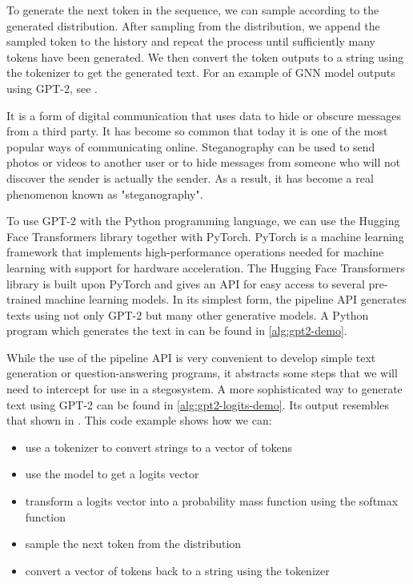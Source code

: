 To generate the next token in the sequence, we can sample according to the generated distribution.
After sampling from the distribution, we append the sampled token to the history and repeat the process until sufficiently many tokens have been generated.
We then convert the token outputs to a string using the tokenizer to get the generated text.
For an example of GNN model outputs using GPT-2, see .

\begin{example}
It is a form of digital communication that uses data to hide or obscure messages from a third party. It has become so common that today it is one of the most popular ways of communicating online. Steganography can be used to send photos or videos to another user or to hide messages from someone who will not discover the sender is actually the sender. As a result, it has become a real phenomenon known as "steganography".
  \label{example:gpt2-output-sample}
\end{example}

To use GPT-2 with the Python programming language, we can use the Hugging Face Transformers library together with PyTorch.
PyTorch \cite{PyTorch} is a machine learning framework that implements high-performance operations needed for machine learning with support for hardware acceleration.
The Hugging Face Transformers library \cite{HFTransformers} is built upon PyTorch and gives an API for easy access to several pre-trained machine learning models.
In its simplest form, the pipeline API generates texts using not only GPT-2 but many other generative models.
A Python program which generates the text in  can be found in \autoref{alg:gpt2-demo}.

While the use of the pipeline API is very convenient to develop simple text generation or question-answering programs, it abstracts some steps that we will need to intercept for use in a stegosystem.
A more sophisticated way to generate text using GPT-2 can be found in \autoref{alg:gpt2-logits-demo}.
Its output resembles that shown in . 
This code example shows how we can:

\begin{itemize}
  \item use a tokenizer to convert strings to a vector of tokens
  \item use the model to get a logits vector
  \item transform a logits vector into a probability mass function using the softmax function
  \item sample the next token from the distribution
  \item convert a vector of tokens back to a string using the tokenizer
\end{itemize}


